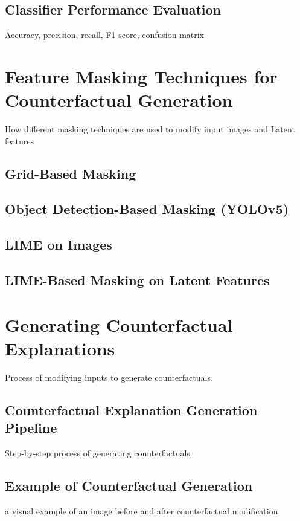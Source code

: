 \subsection{Classifier Performance Evaluation}
Accuracy, precision, recall, F1-score, confusion matrix


\section{Feature Masking Techniques for Counterfactual Generation}
How different masking techniques are used to modify input images and Latent features

\subsection{ Grid-Based Masking}

\subsection{Object Detection-Based Masking (YOLOv5)}

\subsection{LIME on Images}

\subsection{LIME-Based Masking on Latent Features}




\section{Generating Counterfactual Explanations}
Process of modifying inputs to generate counterfactuals.

\subsection{Counterfactual Explanation Generation Pipeline}
Step-by-step process of generating counterfactuals.


\subsection{Example of Counterfactual Generation}
a visual example of an image before and after counterfactual modification.